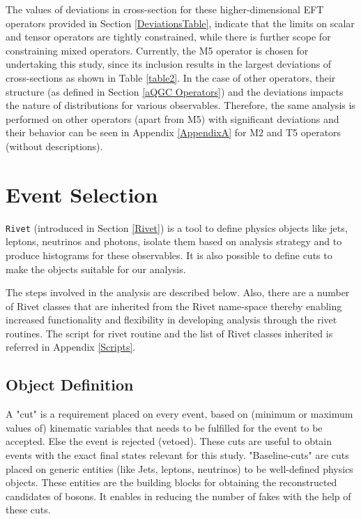 The values of deviations in cross-section for these higher-dimensional EFT operators provided in Section \ref{DeviationsTable},  indicate that the limits on scalar and tensor operators are tightly constrained, while there is further scope for constraining mixed operators. Currently, the M5 operator is chosen for undertaking this study, since its inclusion results in the largest deviations of cross-sections as shown in Table \ref{table2}. In the case of other operators, their structure (as defined in Section \ref{aQGC Operators}) and the deviations impacts the nature of distributions for various observables. Therefore, the same analysis is performed on other operators (apart from M5) with significant deviations and their behavior can be seen in Appendix \ref{AppendixA} for M2 and T5 operators (without descriptions).

%
\section{Event Selection}\label{Event Selection}
\texttt{Rivet} (introduced in Section \ref{Rivet}) is a tool to define physics objects like jets, leptons, neutrinos and photons, isolate them based on analysis strategy and to produce histograms for these observables. It is also possible to define cuts to make the objects suitable for our analysis.

The steps involved in the analysis are described  below. Also, there are a number of Rivet classes that are inherited from the Rivet name-space thereby enabling increased functionality and flexibility in developing analysis through the rivet routines.  The script for rivet routine and the list of Rivet classes inherited is referred in Appendix \ref{Scripts}.

\subsection{Object Definition}
 A "cut" \label{CutDefn}is a requirement placed on every event, based on (minimum or maximum values of) kinematic variables that needs to be fulfilled for the event to be accepted.  Else the event is rejected (vetoed). These cuts are useful to obtain events with the exact final states relevant for this study. "Baseline-cuts" are cuts placed on generic entities (like Jets, leptons, neutrinos) to be well-defined physics objects. These entities are the building blocks for obtaining the reconstructed candidates of bosons. It enables in reducing the number of fakes with the help of these cuts.

